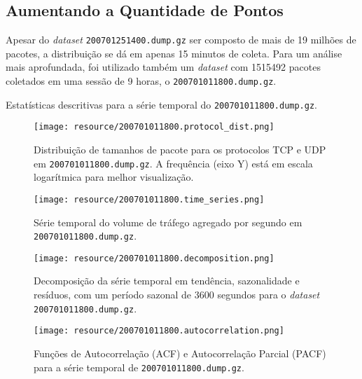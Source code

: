\FloatBarrier
\subsection{Aumentando a Quantidade de Pontos}

Apesar do \emph{dataset} \texttt{200701251400.dump.gz} ser composto de mais de 19 milhões de pacotes, a
distribuição se dá em apenas 15 minutos de coleta. Para um análise mais aprofundada, foi utilizado também um
\emph{dataset} com 1515492 pacotes coletados em uma sessão de 9 horas, o \texttt{200701011800.dump.gz}.

\begin{table}[!htb]
    \centering
    \caption{Estatísticas descritivas para a série temporal do \texttt{200701011800.dump.gz}.}
    \label{tab:eda-describe-2}
    
\end{table}

\begin{figure}[!htb]
    \centering
    \texttt{[image: resource/200701011800.protocol\_dist.png]}
    \caption{Distribuição de tamanhos de pacote para os protocolos TCP e UDP em
        \texttt{200701011800.dump.gz}. A frequência (eixo Y) está em
    escala logarítmica para melhor visualização.}
    \label{fig:eda-protocol-dist-2}
\end{figure}

\begin{figure}[!htb]
    \centering
    \texttt{[image: resource/200701011800.time\_series.png]}
    \caption{Série temporal do volume de tráfego agregado por segundo em \texttt{200701011800.dump.gz}.}
    \label{fig:eda-timeseries-2}
\end{figure}

\begin{figure}[!htb]
    \centering
    \texttt{[image: resource/200701011800.decomposition.png]}
    \caption{Decomposição da série temporal em tendência, sazonalidade e resíduos, com um período sazonal de
    3600 segundos para o \emph{dataset} \texttt{200701011800.dump.gz}.}
    \label{fig:eda-decomposition-2}
\end{figure}

\begin{figure}[!htb]
    \centering
    \texttt{[image: resource/200701011800.autocorrelation.png]}
    \caption{Funções de Autocorrelação (ACF) e Autocorrelação Parcial (PACF) para a série temporal de
    \texttt{200701011800.dump.gz}.}
    \label{fig:eda-acf-pacf-2}
\end{figure}

